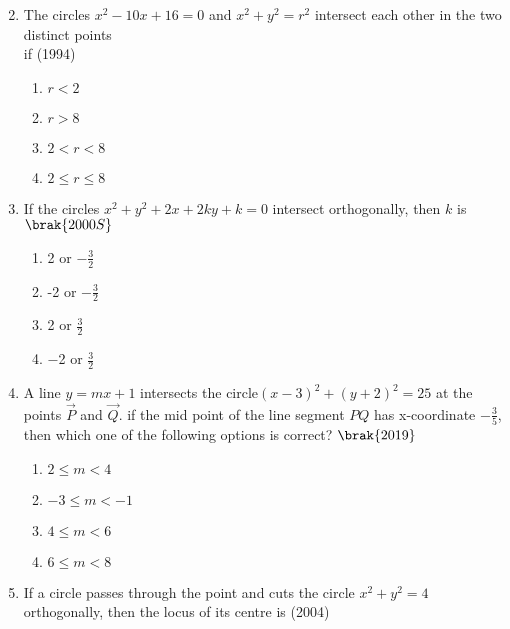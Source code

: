 \begin{enumerate}
\begin{multicols}{2}
\end{multicols}
    \item The circles $x^{2}-10x+16=0$ and $x^{2}+y^{2}=r^{2}$ intersect each other in the two distinct points\\ if
    \hfill {(1994)}
    \begin{multicols}{2}
\begin{enumerate}
    	\item $r<2$
    	\item $r>8$
    	\item $2<r<8$
    	\item $2\leq r\leq8$
    \end{enumerate}
\end{multicols}
     \item If the circles $x^2+y^2+2x+2ky+k=0$ intersect orthogonally, then $k$ is
        \hfill$\brak{2000S}$
    \begin{multicols}{2}
\begin{enumerate}
        \item 2 or $-\frac{3}{2}$
        \item -2 or $-\frac{3}{2}$
        \item 2 or $\frac{3}{2}$
        \item $-$2 or $\frac{3}{2}$
    \end{enumerate}
    \end{multicols}
             \item A line $y=mx+1$ intersects the circle$(x-3)^2+(y+2)^2=25$ at the points $\vec{P}$ and $\vec{Q}$. if the mid point of the line segment $PQ$ has x-coordinate $-\frac{3}{5}$,  then which one of the following options is correct?
                 \hfill$\brak{ 2019}$
                 \begin{multicols}{2}
\begin{enumerate}
                 \item $2\le m<4$
                 \item $-3\le m<-1$
                 \item $4\le m<6$
                 \item $6\le m<8$
             \end{enumerate}
\end{multicols}
\item If a circle passes through the point  and cuts the circle $x^2+y^2=4$ orthogonally,  then the locus of its centre is
\hfill{(2004)}
\begin{multicols}{2}
\begin{enumerate}

\end{enumerate}
\end{multicols}
\end{enumerate}
